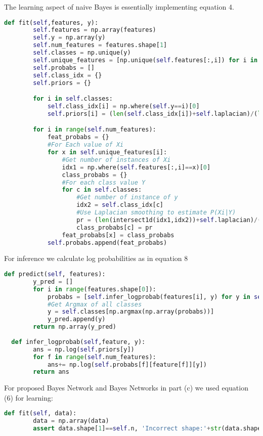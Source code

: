 \documentclass[addpoints,11pt,a4paper]{exam}
\begin{document}
\begin{questions}
\begin{parts}
\begin{solution}
  The learning aspect of naive Bayes is essentially implementing equation 4.
  \begin{lstlisting}[language=Python, style=mystyle]
  def fit(self,features, y):
        self.features = np.array(features)
        self.y = np.array(y)
        self.num_features = features.shape[1]
        self.classes = np.unique(y)
        self.unique_features = [np.unique(self.features[:,i]) for i in range(self.num_features)]
        self.probabs = []
        self.class_idx = {}
        self.priors = {}

        for i in self.classes:
            self.class_idx[i] = np.where(self.y==i)[0]
            self.priors[i] = (len(self.class_idx[i])+self.laplacian)/(len(self.y) + self.laplacian*len(self.classes))            

        for i in range(self.num_features):
            feat_probabs = {}
            #For Each value of Xi
            for x in self.unique_features[i]:
                #Get number of instances of Xi
                idx1 = np.where(self.features[:,i]==x)[0]
                class_probabs = {}
                #For each class value Y
                for c in self.classes:
                    #Get number of instance of y
                    idx2 = self.class_idx[c]
                    #Use Laplacian smoothing to estimate P(Xi|Y)
                    pr = (len(intersect1d(idx1,idx2))+self.laplacian)/(len(idx2)+self.laplacian*len(self.unique_features[i]))
                    class_probabs[c] = pr
                feat_probabs[x] = class_probabs
            self.probabs.append(feat_probabs)
  \end{lstlisting}
  
  For inference we calculate log probabilities as in equation 8
  \begin{lstlisting}[language=Python, style=mystyle]
  def predict(self, features):
        y_pred = []
        for i in range(features.shape[0]):
            probabs = [self.infer_logprobab(features[i], y) for y in self.classes]
            #Get Argmax of all classes
            y = self.classes[np.argmax(np.array(probabs))]
            y_pred.append(y)
        return np.array(y_pred)
        
  def infer_logprobab(self,feature, y):
        ans = np.log(self.priors[y])
        for f in range(self.num_features):
            ans+= np.log(self.probabs[f][feature[f]][y])
        return ans
  \end{lstlisting}
 
 For proposed Bayes Network and Bayes Networks in part (c) we used equation (6) for learning:
 \begin{lstlisting}[language=Python, style=mystyle]
 def fit(self, data):
        data = np.array(data)
        assert data.shape[1]==self.n, 'Incorrect shape:'+str(data.shape)


\end{lstlisting}
\end{solution}
\end{parts}
\end{questions}
\end{document}
